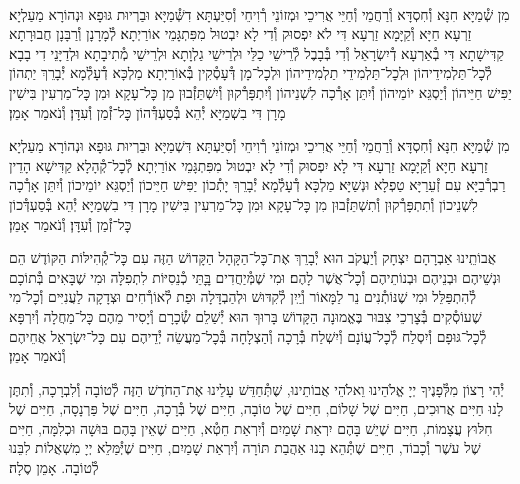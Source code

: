 \documentclass[twoside, openany, parskip=half, 11pt]{book}
\begin{document}

\shabbos\\
מִן שְׁ֯מַיָּא חִנָּא וְ֯חִסְדָּא וְ֯רַחֲמֵי וְ֯חַיֵּי אֲרִיכֵי וּמְזוֹנֵי רְ֯וִיחֵי וְ֯סִיַּעְתָּא דִשְּׁ֯מַיָּא וּבַרְיוּת גּוּפָא וּנְהוֹרָא מַעַלְיָא׃ זַרְעָא חַיָּא וְ֯קַיָּמָא זַרְעָא דִּי לֹא יִפְסוּק וְ֯דִי לָא יִבְטוּל מִפִּתְגָּמֵי אוֹרַיְתָא׃ לְ֯מָרָנָן וְ֯רַבָּנָן חֲבוּרָתָא קַדִּישָׁתָא דִּי בְ֯אַרְעָא דְ֯יִשְׂרָאֵל וְ֯דִי בְּ֯בָבֶל לְ֯רֵישֵׁי כַלֵּי וּלְרֵישֵׁי גַלְוָתָא וּלְרֵישֵׁי מְ֯תִיבָתָא וּלְדַיָּנֵי דִי בָבָא׃ לְ֯כׇל־תַּלְמִידֵיהוֹן וּלְכׇל־תַּלְמִידֵי תַלְמִידֵיהוֹן וּלְכׇל־מָן דְּ֯עָסְ֯קִין בְּ֯אוֹרַיְתָא׃ מַלְכָּא דְ֯עָלְ֯מָא יְ֯בָרֵךְ יַתְהוֹן יַפִּישׁ חַיֵּיהוֹן וְ֯יַסְגֵּא יוֹמֵיהוֹן וְ֯יִתֵּן אָרְ֯כָה לִשְׁנֵיהוֹן וְ֯יִתְפָּרְ֯קוּן וְ֯יִשְׁתֵּזְ֯בוּן מִן כׇּל־עָקָא וּמִן כׇּל־מַרְעִין בִּישִׁין מָרָן דִּי בִשְׁמַיָּא יְ֯הֵא בְּ֯סַעְדְּ֯הוֹן כׇּל־זְ֯מַן וְ֯עִדָּן׃ וְ֯נֹאמַר אָמֵן׃



מִן שְׁ֯מַיָּא חִנָּא וְ֯חִסְדָּא וְ֯רַחֲמֵי וְ֯חַיֵּי אֲרִיכֵי וּמְזוֹנֵי רְ֯וִיחֵי וְ֯סִיַּעְתָּא דִּשְׁמַיָּא וּבַרְיוּת גּוּפָא וּנְהוֹרָא מַעַלְיָא׃ זַרְעָא חַיָּא וְ֯קַיָּמָא זַרְעָא דִּי לָא יִפְסוּק וְ֯דִי לָא יִבְטוּל מִפִּתְגָּמֵי אוֹרַיְתָא׃ לְ֯כׇל־קְ֯הָלָא קַדִּישָׁא הָדֵין רַבְרְ֯בַיָּא עִם זְ֯עֵרַיָּא טַפְלָא וּנְשַׁיָּא׃ מַלְכָּא דְ֯עָלְ֯מָא יְ֯בָרֵךְ יָתְ֯כוֹן יַפִּישׁ חַיֵּיכוֹן וְ֯יַסְגֵּא יוֹמֵיכוֹן וְ֯יִתֵּן אָרְ֯כָה לִשְׁנֵיכוֹן וְ֯תִתְפָּרְ֯קוּן וְ֯תִשְׁתֵּזְ֯בוּן מִן כׇּל־עָקָא וּמִן כׇּל־מַרְעִין בִּישִׁין מָרָן דִּי בִשְׁמַיָּא יְ֯הֵא בְּ֯סַעְדְּ֯כוֹן כׇּל־זְ֯מַן וְ֯עִדָּן׃ וְ֯נֹאמַר אָמֵן׃

אֲבוֹתֵֽינוּ אַבְרָהָם יִצְחָק וְ֯יַעֲקֹב הוּא יְ֯בָרֵךְ אֶת־כׇּל־הַקָּהָל הַקָּדוֹשׁ הַזֶּה עִם כׇּל־קְ֯הִילּוֹת הַקּוֹדֶשׁ הֵם וּנְשֵׁיהֶם וּבְנֵיהֶם וּבְנוֹתֵיהֶם וְ֯כׇל־אֲשֶׁר לָהֶם׃ וּמִי שֶׁמְּ֯יַחֲדִים בׇׇּתֵּי כְ֯נֵסִיּוֹת לִתְפִלָּה וּמִי שֶׁבָּאִים בְּ֯תוֹכָם לְ֯הִתְפַּלֵּל וּמִי שֶׁנּוֹתְ֯נִים נֵר לַמָּאוֹר וְ֯יַֽיִן לְ֯קִדּוּשׁ וּלְהַבְדָּלָה וּפַת לְ֯אוֹרְ֯חִים וּצְדָקָה לַעֲנִיִּים וְ֯כׇל־מִי שֶׁעוֹסְ֯קִים בְּ֯צׇרְכֵי צִבּוּר בֶּאֱמוּנָה הַקָּדוֹשׁ בָּרוּךְ הוּא יְ֯שַׁלֵם שְׂ֯כָרָם וְ֯יָסִיר מֵהֶם כׇּל־מַחֲלָה וְ֯יִרְפָּא לְ֯כׇל־גּוּפָם וְ֯יִסְלַח לְ֯כׇל־עֲוֹנָם וְ֯יִשְׁלַח בְּ֯רָכָה וְ֯הַצְלָחָה בְּ֯כׇל־מַעֲשֵׂה יְ֯דֵיהֶם עִם כָּל־יִשְׂרָאֵל אֲחֵיהֶם וְ֯נֹאמַר אָמֵן׃







יְ֯הִי רָצוֹן מִלְּ֯פָנֶיךָ יְיָ אֱלֹהֵינוּ וֵאלֹהֵי אֲבוֹתֵינוּ,
שֶׁתְּ֯חַדֵּשׁ עָלֵינוּ אֶת־הַחֹדֶשׁ הַזֶּה לְ֯טוֹבָה וְ֯לִבְרָכָה,
וְ֯תִתֶּן לָנוּ חַיִּים אֲרוּכִים,
חַיִּים שֶׁל שָׁלוֹם,
חַיִּים שֶׁל טוֹבָה,
חַיִּים שֶׁל בְּ֯רָכָה,
חַיִּים שֶׁל פַּרְנָסָה,
חַיִּים שֶׁל חִלּוּץ עֲצָמוֹת,
חַיִּים שֶׁיֵשׁ בָּהֶם יִרְאַת שָׁמַיִם וְ֯יִרְאַת חֵטְ֯א,
חַיִּים שֶׁאֵין בָּהֶם בּוּשָׁה וּכְלִמָּה,
חַיִּים שֶׁל עשֶׁר וְ֯כָבוֹד,
חַיִּים שֶׁתְּ֯הֵא בָנוּ אַהֲבַת תּוֹרָה וְ֯יִרְאַת שָׁמַיִם,
חַיִּים שֶׁיְּ֯מַּלֵא יְיָ מִשְׁאֲלוֹת לִבֵּנוּ לְ֯טוֹבָה. אָמֵן סֶלָה׃
\end{document}
